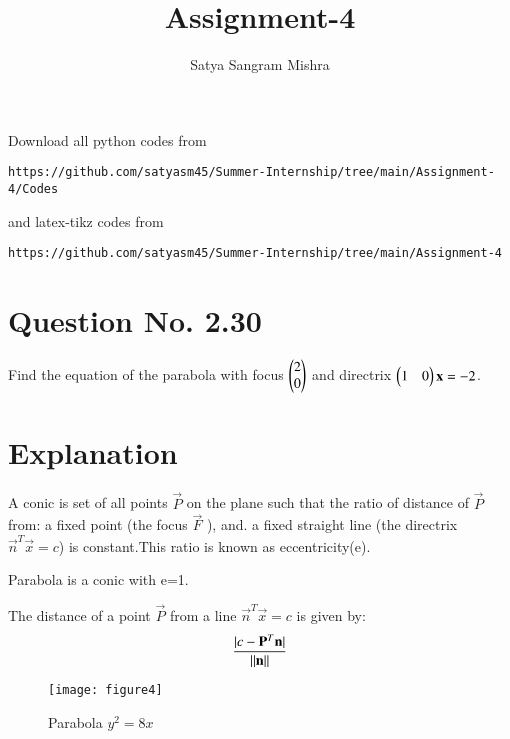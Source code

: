 \documentclass[journal,12pt,twocolumn]{IEEEtran}
\begin{document}
     \def\centbox#1{\makebox[0in]{#1}}
     \def\topbox#1{\raisebox{-\baselineskip}[0in][0in]{#1}}
     \def\midbox#1{\raisebox{-0.5\baselineskip}[0in][0in]{#1}}
\vspace{3cm}
\title{Assignment-4}
\author{Satya Sangram Mishra}
\maketitle
\newpage
\bigskip
\renewcommand{\thefigure}{\theenumi}
\renewcommand{\thetable}{\theenumi}
Download all python codes from 
\begin{lstlisting}
https://github.com/satyasm45/Summer-Internship/tree/main/Assignment-4/Codes
\end{lstlisting}
%
and latex-tikz codes from 
%
\begin{lstlisting}
https://github.com/satyasm45/Summer-Internship/tree/main/Assignment-4
\end{lstlisting}
%
\section{Question No. 2.30}
Find the equation of the parabola with focus $\begin{pmatrix}2\\0\end{pmatrix}$ and directrix $\begin{pmatrix}1&0\end{pmatrix}\mathbf{x}=-2$.
%
\section{Explanation}
\begin{definition}
\label{def}
A conic is set of all points $\vec{P}$ on the plane such that the ratio of distance of $\vec{P}$ from: a fixed point (the focus $\vec{F}$ ), and. a fixed straight line (the directrix $\vec{n}^T\vec{x}=c$) is constant.This ratio is known as eccentricity(e).
\end{definition}
\begin{definition}
Parabola is a conic with e=1.
\end{definition}
\begin{lemma}
\label{lemma}
The distance of a point $\vec{P}$ from a line $\vec{n}^T\vec{x}=c$ is given by:
\begin{align}
\frac{\vert c-\mathbf{P}^T\mathbf{n}\vert}{\Vert\mathbf{n}\rVert}   
\end{align}
\end{lemma}


\begin{figure}[!ht]
\centering
\texttt{[image: figure4]}
\caption{Parabola $y^2=8x$ }
\label{fig:parabola}	
\end{figure}
\end{document}
